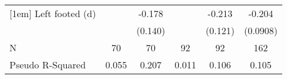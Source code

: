 {\begin{tabular}{l*{5}{c}}
[1em]
Left footed (d)     &                     &      -0.178         &                     &      -0.213\sym{*}  &      -0.204\sym{**} \\
                    &                     &     (0.140)         &                     &     (0.121)         &    (0.0908)         \\
\hline
N                   &          70         &          70         &          92         &          92         &         162         \\
Pseudo R-Squared    &       0.055         &       0.207         &       0.011         &       0.106         &       0.105         \\
\hline\hline
\end{tabular}
}
